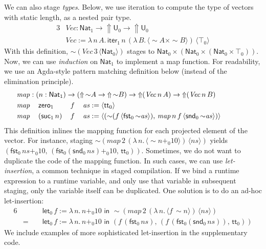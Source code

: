 \documentclass[acmsmall,anonymous,review]{acmart}
\newcommand{\mit}[1]{\mathit{#1}}
\newcommand{\msf}[1]{\mathsf{#1}}
\newcommand{\Lift}{{\Uparrow}}
\newcommand{\spl}{{\sim}}
\newcommand{\qut}[1]{\langle #1\rangle}
\renewcommand{\U}{\msf{U}}
\newcommand{\Nat}{\msf{Nat}}
\newcommand{\zero}{\msf{zero}}
\newcommand{\suc}{\msf{suc}}
\renewcommand{\tt}{\msf{tt}}
\newcommand{\fst}{\msf{fst}}
\newcommand{\snd}{\msf{snd}}
\newcommand{\mylet}{\msf{let}}
\theoremstyle{remark}
\begin{document}
We can also stage \emph{types}. Below, we use iteration to compute the type of
vectors with static length, as a nested pair type.
\begin{alignat*}{3}
  &\mit{Vec} : \Nat_1 \to \Lift \U_0 \to \Lift \U_0\\
  &\mit{Vec} := \lambda\,n\,A.\,\msf{iter}_1\,n\,(\lambda\,B.\,\qut{\spl A \times \spl B})\,\qut{\top_0}
\end{alignat*}
With this definition, $\spl(\mit{Vec}\,3\,\qut{\Nat_0})$ stages to $\Nat_0
\times (\Nat_0 \times (\Nat_0 \times \top_0))$. Now, we can use \emph{induction}
on $\Nat_1$ to implement a map function. For readability, we use an Agda-style
pattern matching definition below (instead of the elimination principle).
\begin{alignat*}{6}
  &\hspace{-3em}\rlap{$\mit{map} : (n : \Nat_1) \to (\Lift\,\spl A \to \Lift\,\spl B) \to \Lift(\mit{Vec}\,n\,A) \to \Lift(\mit{Vec}\,n\,B)$}\\
  &\hspace{-3em}\mit{map}\,&&\zero_1      && f\,&&\mit{as} := \qut{\tt_0}\\
  &\hspace{-3em}\mit{map}\,&&(\suc_1\,n)\,&& f\,&&\mit{as} :=
     \qut{(\spl(f\,\qut{\fst_0\,\spl\mit{as}}),\,\mit{map}\,n\,f\,\qut{\snd_0\,\spl \mit{as}})}
\end{alignat*}
This definition inlines the mapping function for each projected element of the
vector. For instance, staging $\spl(\mit{map}\,2\,(\lambda\,n.\,\qut{\spl n +_0
  10})\,\qut{\mit{ns}})$ yields $(\fst_0\,\mit{ns} +_0
10,\,(\fst_0(\snd_0\,\mit{ns}) +_0 10,\,\tt_0))$. Sometimes, we do not want to
duplicate the code of the mapping function. In such cases, we can use
\emph{let-insertion}, a common technique in staged compilation. If we bind a runtime
expression to a runtime variable, and only use that variable in subsequent
staging, only the variable itself can be duplicated. One solution is to do an
ad-hoc let-insertion:
\begin{alignat*}{6}
  &   && \mylet_0\,f := \lambda\,n.\, n +_0 10\,\,\msf{in}\,\,
         \spl(\mit{map}\,2\,(\lambda\,n.\,\qut{f\,\spl n})\,\qut{\mit{ns}}) \\
  & =\,\,&&  \mylet_0\,f := \lambda\,n.\, n +_0 10\,\,\msf{in}\,\,
          (f\,(\fst_0\,\mit{ns}),\,(f\,(\fst_0(\snd_0\,\mit{ns})),\,\tt_0))
\end{alignat*}
We include examples of more sophisticated let-insertion in the supplementary
code.
\end{document}
